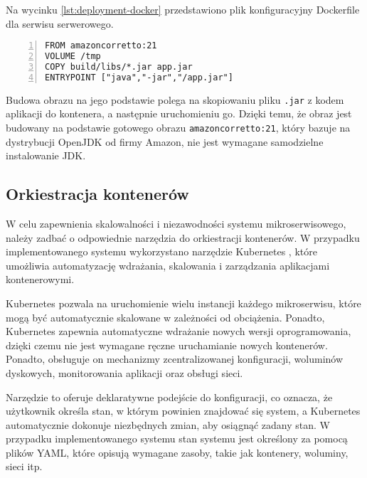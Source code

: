 Na wycinku \ref{lst:deployment-docker} przedstawiono plik konfiguracyjny Dockerfile dla serwisu serwerowego.

\begin{lstlisting}[caption={Instrukcja budowania obrazu Docker serwisu serwerowego},label={lst:deployment-docker},captionpos=b,numbers=left]
FROM amazoncorretto:21
VOLUME /tmp
COPY build/libs/*.jar app.jar
ENTRYPOINT ["java","-jar","/app.jar"]
\end{lstlisting}

Budowa obrazu na jego podstawie polega na skopiowaniu pliku \texttt{.jar} z kodem aplikacji do kontenera, a następnie uruchomieniu go. Dzięki temu, że obraz jest budowany na podstawie gotowego obrazu \texttt{amazoncorretto:21}, który bazuje na dystrybucji OpenJDK od firmy Amazon, nie jest wymagane samodzielne instalowanie JDK.
    
\subsection{Orkiestracja kontenerów}

W celu zapewnienia skalowalności i niezawodności systemu mikroserwisowego, należy zadbać o odpowiednie narzędzia do orkiestracji kontenerów. W przypadku implementowanego systemu wykorzystano narzędzie Kubernetes \cite{k8s}, które umożliwia automatyzację wdrażania, skalowania i zarządzania aplikacjami kontenerowymi.

Kubernetes pozwala na uruchomienie wielu instancji każdego mikroserwisu, które mogą być automatycznie skalowane w zależności od obciążenia. Ponadto, Kubernetes zapewnia automatyczne wdrażanie nowych wersji oprogramowania, dzięki czemu nie jest wymagane ręczne uruchamianie nowych kontenerów. Ponadto, obsługuje on mechanizmy zcentralizowanej konfiguracji, woluminów dyskowych, monitorowania aplikacji oraz obsługi sieci.

Narzędzie to oferuje deklaratywne podejście do konfiguracji, co oznacza, że użytkownik określa stan, w którym powinien znajdować się system, a Kubernetes automatycznie dokonuje niezbędnych zmian, aby osiągnąć zadany stan. W przypadku implementowanego systemu stan systemu jest określony za pomocą plików YAML, które opisują wymagane zasoby, takie jak kontenery, woluminy, sieci itp.

